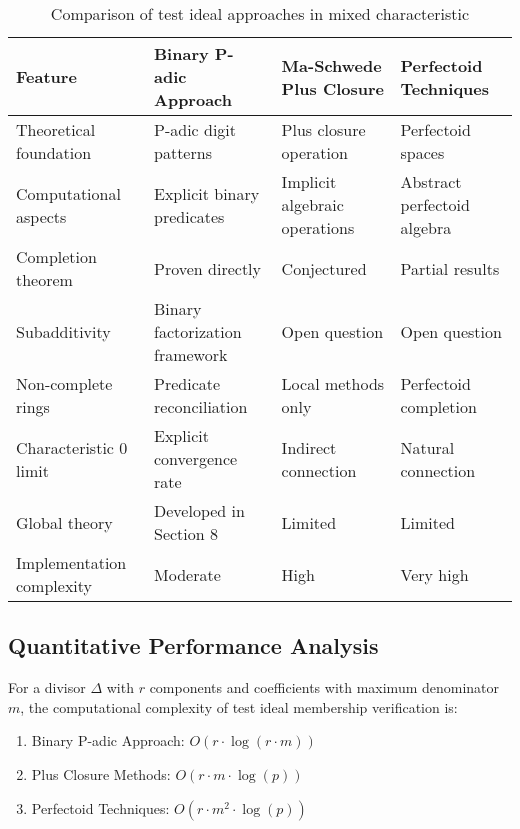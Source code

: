 \begin{table}[h]
\begin{tabular}{|p{3cm}|p{3cm}|p{3cm}|p{3cm}|}
\hline
\textbf{Feature} & \textbf{Binary P-adic Approach} & \textbf{Ma-Schwede Plus Closure} & \textbf{Perfectoid Techniques} \\
\hline
Theoretical foundation & P-adic digit patterns & Plus closure operation & Perfectoid spaces \\
\hline
Computational aspects & Explicit binary predicates & Implicit algebraic operations & Abstract perfectoid algebra \\
\hline
Completion theorem & Proven directly & Conjectured & Partial results \\
\hline
Subadditivity & Binary factorization framework & Open question & Open question \\
\hline
Non-complete rings & Predicate reconciliation & Local methods only & Perfectoid completion \\
\hline
Characteristic 0 limit & Explicit convergence rate & Indirect connection & Natural connection \\
\hline
Global theory & Developed in Section 8 & Limited & Limited \\
\hline
Implementation complexity & Moderate & High & Very high \\
\hline
\end{tabular}
\caption{Comparison of test ideal approaches in mixed characteristic}
\label{tab:comparison}
\end{table}

\subsection{Quantitative Performance Analysis}

\begin{proposition}
For a divisor $\Delta$ with $r$ components and coefficients with maximum denominator $m$, the computational complexity of test ideal membership verification is:
\begin{enumerate}
    \item Binary P-adic Approach: $O(r \cdot \log(r \cdot m))$
    \item Plus Closure Methods: $O(r \cdot m \cdot \log(p))$
    \item Perfectoid Techniques: $O(r \cdot m^2 \cdot \log(p))$
\end{enumerate}
\end{proposition}

